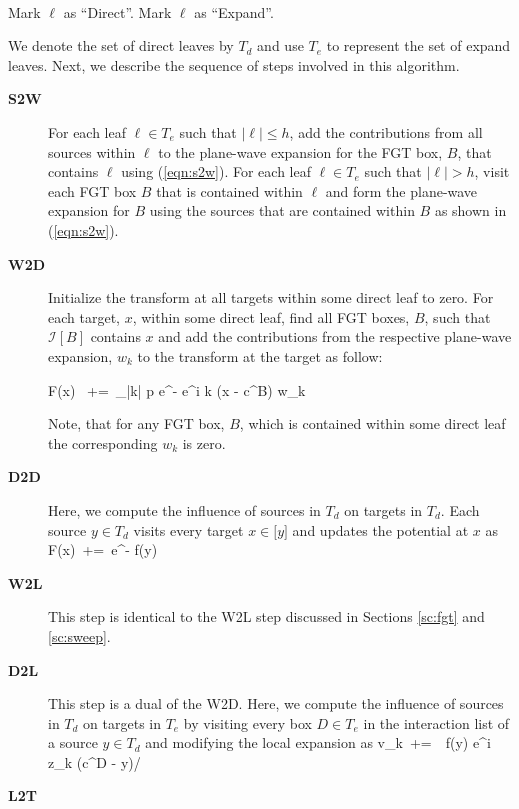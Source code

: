 {\tt
\begin{algorithmic}
\STATE
          \STATE Mark $\ell$ as ``Direct''. 
      \ELSE
          \STATE Mark $\ell$ as ``Expand''. 
      \ENDIF
  \ENDFOR
\STATE
\end{algorithmic}
}

We denote the set of direct leaves by $T_d$ and use $T_e$ to represent the set of expand leaves. Next,
we describe the sequence of steps involved in this algorithm.

\begin{description}
\item[\textbf{S2W}] For each leaf $\ell \in T_e$ such that $|\ell| \leq h$, add the contributions from all sources within $\ell$
to the plane-wave expansion for the FGT box, $B$, that contains $\ell$ using (\ref{eqn:s2w}). For each leaf $\ell \in T_e$ such that $|\ell| > h$,
visit each FGT box $B$ that is contained within $\ell$ and form the plane-wave expansion for $B$ using the sources that are contained within $B$
as shown in (\ref{eqn:s2w}).

\item[\textbf{W2D}] Initialize the transform at all targets within some direct leaf to zero. For
 each target, $x$, within some direct leaf, find all FGT boxes, $B$, such that $\mathcal{I}[B]$ contains $x$ and
 add the contributions from the respective plane-wave expansion, $w_k$ to the transform at the target as follow: 

\beq F(x) \, +=\, \sum_{|k| \leq p} e^{-} e^{i \lambda k \cdot (x - c^B)} w_k \label{eqn:w2d} \eeq

Note, that for any FGT box, $B$, which is contained within some direct leaf the corresponding $w_k$ is zero.

\item[\textbf{D2D}] Here, we compute the influence of sources in $T_d$ on targets in $T_d$. Each source $y \in T_d$ visits 
every target $x \in \mathcal[y]$ and updates the potential at $x$ as 
%  
\beq F(x) \,+=\, e^{-} f(y) \label{eqn:d2d} \eeq
%

\item[\textbf{W2L}] This step is identical to the W2L step discussed in Sections \ref{sc:fgt} and \ref{sc:sweep}.

\item[\textbf{D2L}] This step is a dual of the W2D. Here, we compute the influence of sources in $T_d$ on targets in $T_e$ by 
visiting every box $D \in T_e$ in the interaction list of a source $y \in T_d$ and modifying the local expansion as 
%
\beq v_k  \,+=\, \, f(y) e^{i z_k \cdot (c^D - y)/\sqrt{\delta}} \label{eqn:d2l} \eeq

\item[\textbf{L2T}]
\end{description}
   
